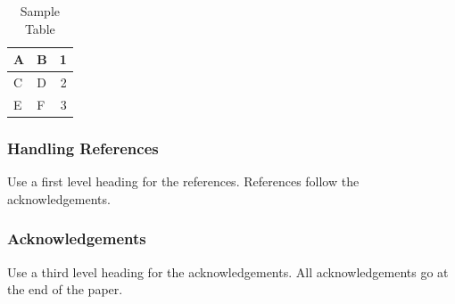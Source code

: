 \documentclass[a4paper]{article}
\begin{document}
\begin{table}[ht]
\begin{center}
\caption{Sample Table}

\bigskip

\begin{tabular}{|l|l|r|}
\hline
A & B & 1\\ \hline
C & D & 2\\
E & F & 3\\ \hline
\end{tabular}
\end{center}
\end{table}


\subsubsection{Handling References}

Use a first level heading for the references. References follow the
acknowledgements.


\subsubsection{Acknowledgements}

Use a third level heading for the acknowledgements. All acknowledgements
go at the end of the paper.


% 
 

\end{document}
